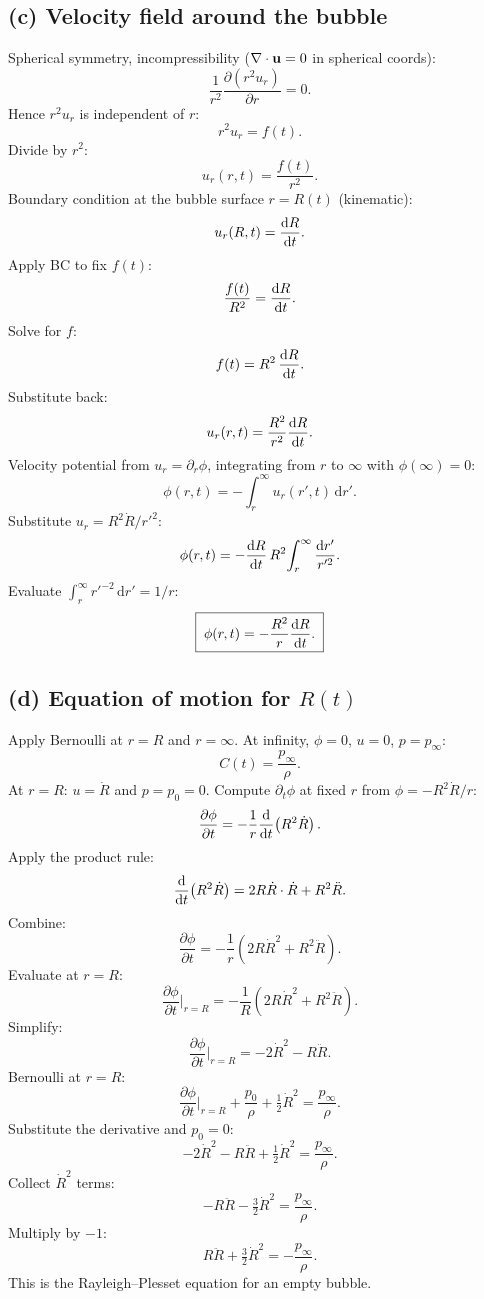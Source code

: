 \documentclass[11pt]{article}
\newcommand{\de}{\mathrm{d}}
\newcommand{\pd}[2]{\frac{\partial #1}{\partial #2}}
\begin{document}
\subsection*{(c) Velocity field around the bubble}

Spherical symmetry, incompressibility ($\nabla\cdot\vb u=0$ in spherical coords):
\[ \frac{1}{r^2}\pd{(r^2 u_r)}{r} = 0. \]
Hence $r^2 u_r$ is independent of $r$:
\[ r^2 u_r = f(t). \]
Divide by $r^2$:
\[ u_r(r,t) = \frac{f(t)}{r^2}. \]
Boundary condition at the bubble surface $r=R(t)$ (kinematic):
\[ u_r(R,t) = \dv{R}{t}. \]
Apply BC to fix $f(t)$:
\[ \frac{f(t)}{R^2} = \dv{R}{t}. \]
Solve for $f$:
\[ f(t) = R^2\,\dv{R}{t}. \]
Substitute back:
\[ u_r(r,t) = \frac{R^2}{r^2}\dv{R}{t}. \]
Velocity potential from $u_r = \partial_r\phi$, integrating from $r$ to $\infty$ with $\phi(\infty)=0$:
\[ \phi(r,t) = -\int_r^\infty u_r(r',t)\,\de r'. \]
Substitute $u_r=R^2\dot R/r'^{2}$:
\[ \phi(r,t) = -\dv{R}{t}\,R^2\!\int_r^\infty\frac{\de r'}{r'^2}. \]
Evaluate $\int_r^\infty r'^{-2}\,\de r' = 1/r$:
\[ \boxed{\;\phi(r,t) = -\frac{R^2}{r}\dv{R}{t}.\;} \]

\subsection*{(d) Equation of motion for $R(t)$}

Apply Bernoulli at $r=R$ and $r=\infty$. At infinity, $\phi=0$, $u=0$, $p=p_\infty$:
\[ C(t) = \frac{p_\infty}{\rho}. \]
At $r=R$: $u=\dot R$ and $p=p_0=0$. Compute $\partial_t\phi$ at fixed $r$ from $\phi = -R^2\dot R/r$:
\[ \pd{\phi}{t} = -\frac{1}{r}\dv{t}\!\left(R^2 \dot R\right). \]
Apply the product rule:
\[ \dv{t}\!\left(R^2\dot R\right) = 2R\dot R\cdot\dot R + R^2\ddot R. \]
Combine:
\[ \pd{\phi}{t} = -\frac{1}{r}\!\left(2 R \dot R^2 + R^2 \ddot R\right). \]
Evaluate at $r=R$:
\[ \pd{\phi}{t}\bigg|_{r=R} = -\frac{1}{R}(2R\dot R^2 + R^2\ddot R). \]
Simplify:
\[ \pd{\phi}{t}\bigg|_{r=R} = -2\dot R^2 - R\ddot R. \]
Bernoulli at $r=R$:
\[ \pd{\phi}{t}\bigg|_{r=R} + \frac{p_0}{\rho} + \tfrac12 \dot R^2 = \frac{p_\infty}{\rho}. \]
Substitute the derivative and $p_0=0$:
\[ -2\dot R^2 - R\ddot R + \tfrac12 \dot R^2 = \frac{p_\infty}{\rho}. \]
Collect $\dot R^2$ terms:
\[ -R\ddot R - \tfrac32\dot R^2 = \frac{p_\infty}{\rho}. \]
Multiply by $-1$:
\[ \boxed{\;R\ddot R + \tfrac32 \dot R^2 = -\frac{p_\infty}{\rho}.\;} \]
This is the Rayleigh--Plesset equation for an empty bubble.
\end{document}
